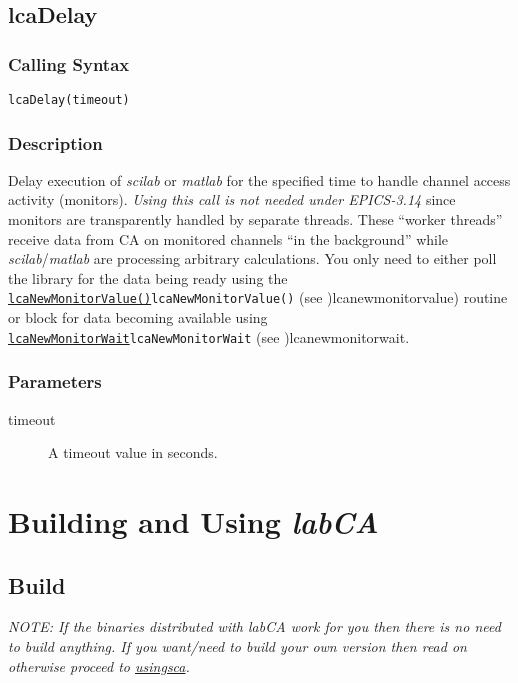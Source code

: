 \documentclass{article}
\newcommand{\sca}{\ita{labCA}}
\newcommand{\scilab}{\ita{scilab}}
\newcommand{\matlab}{\ita{matlab}}
\newcommand{\com}[1]{{\tt #1}}
\newcommand{\pbrk}{\pagebreak[3]}
\newcommand{\pbrkf}{\pagebreak}
\newcommand{\comref}[2]{\hyperref[ref]{\com{#1}}{\com{#1} (see }{)}{#2}}
\newcommand{\ita}[1]{\emph{#1}}
\renewcommand{\pbrk}{}
\renewcommand{\pbrkf}{}
\begin{document}
\vspace*{\fill}
\pbrk
\subsection{lcaDelay}
\label{lcadelay}
\subsubsection{Calling Syntax}
\begin{verbatim}
lcaDelay(timeout)
\end{verbatim}
\subsubsection{Description}
Delay execution of \scilab{} or \matlab{} for the specified time
to handle channel access activity (monitors). 
{\em Using this call is not needed under EPICS-3.14} since monitors
are transparently handled by separate threads. These ``worker threads''
receive data from CA on monitored channels ``in the background'' while
\scilab{}/\matlab{} are processing arbitrary calculations.
You only need to either poll the library for the data being ready using the
\comref{lcaNewMonitorValue()}{lcanewmonitorvalue}) routine
or block for data becoming available using
\comref{lcaNewMonitorWait}{lcanewmonitorwait}.

\subsubsection{Parameters}
\begin{description}
\item[timeout]
A timeout value in seconds.
\end{description}

\pbrkf
\section{Building and Using \sca{}}
\subsection{Build}
{\em NOTE: If the binaries distributed with \sca{} work for you then there is
no need to build anything. If you want/need to build your own version then read on
otherwise proceed to \hyperref{Using \sca}{Subsection~}{}{usingsca}.}
\end{document}
